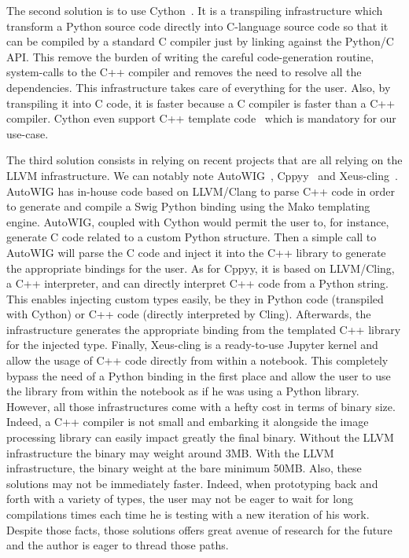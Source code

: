 The second solution is to use Cython~\parencite{behnel.2010.cython}. It is a transpiling infrastructure which transform
a Python source code directly into C-language source code so that it can be compiled by a standard C compiler just by
linking against the Python/C API. This remove the burden of writing the careful code-generation routine, system-calls
to the C++ compiler and removes the need to resolve all the dependencies. This infrastructure takes care of everything
for the user. Also, by transpiling it into C code, it is faster because a C compiler is faster than a C++ compiler.
Cython even support C++ template code~\parencite{behnel.2022.cython-template} which is mandatory for our use-case.

The third solution consists in relying on recent projects that are all relying on the LLVM infrastructure. We can
notably note AutoWIG~\parencite{fernique.2018.autowig}, Cppyy~\parencite{wimtlplavrijsen.2016.cppyy} and
Xeus-cling~\parencite{quantstack.2021.xeus-cling}. AutoWIG has in-house code based on LLVM/Clang to parse C++ code in
order to generate and compile a Swig Python binding using the Mako templating engine. AutoWIG, coupled with Cython would
permit the user to, for instance, generate C code related to a custom Python structure. Then a simple call to AutoWIG
will parse the C code and inject it into the C++ library to generate the appropriate bindings for the user. As for
Cppyy, it is based on LLVM/Cling, a C++ interpreter, and can directly interpret C++ code from a Python string. This
enables injecting custom types easily, be they in Python code (transpiled with Cython) or C++ code (directly interpreted
by Cling). Afterwards, the infrastructure generates the appropriate binding from the templated C++ library for the
injected type. Finally, Xeus-cling is a ready-to-use Jupyter kernel and allow the usage of C++ code directly from within
a notebook. This completely bypass the need of a Python binding in the first place and allow the user to use the library
from within the notebook as if he was using a Python library. However, all those infrastructures come with a hefty cost
in terms of binary size. Indeed, a C++ compiler is not small and embarking it alongside the image processing library can
easily impact greatly the final binary. Without the LLVM infrastructure the binary may weight around 3MB. With the LLVM
infrastructure, the binary weight at the bare minimum 50MB. Also, these solutions may not be immediately faster. Indeed,
when prototyping back and forth with a variety of types, the user may not be eager to wait for long compilations times
each time he is testing with a new iteration of his work. Despite those facts, those solutions offers great avenue of
research for the future and the author is eager to thread those paths.

